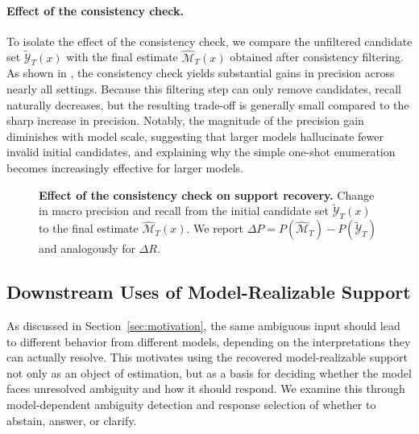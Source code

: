 \paragraph{Effect of the consistency check.}
To isolate the effect of the consistency check, we compare the unfiltered candidate set $\widetilde{\mathcal{Y}}_T(x)$ with the final estimate $\widehat{\mathcal{M}}_T(x)$ obtained after consistency filtering.
As shown in , the consistency check yields substantial gains in precision across nearly all settings. Because this filtering step can only remove candidates, recall naturally decreases, but the resulting trade-off is generally small compared to the sharp increase in precision. Notably, the magnitude of the precision gain diminishes with model scale, suggesting that larger models hallucinate fewer invalid initial candidates, and explaining why the simple one-shot enumeration becomes increasingly effective for larger models.


\begin{figure}[t]
    \centering
    \resizebox{0.98\linewidth}{!}{%
    }
    \caption{
        \textbf{Effect of the consistency check on support recovery.}
        Change in macro precision and recall from the initial candidate set
        \(\widetilde{\mathcal{Y}}_T(x)\) to the final \circleclar{} estimate
        \(\widehat{\mathcal{M}}_T(x)\).
        We report
        \(\Delta P = P(\widehat{\mathcal{M}}_T)-P(\widetilde{\mathcal{Y}}_T)\)
        and analogously for \(\Delta R\).
    }
    \vspace{-1em}
    \label{fig:consistency-filter}
\end{figure}




\subsection{Downstream Uses of Model-Realizable Support}
\label{sec:downstream_qa}
As discussed in Section~\ref{sec:motivation}, the same ambiguous input should lead to different behavior from different models, depending on the interpretations they can actually resolve. This motivates using the recovered model-realizable support not only as an object of estimation, but as a basis for deciding whether the model faces unresolved ambiguity and how it should respond. We examine this through model-dependent ambiguity detection and response selection of whether to abstain, answer, or clarify.

